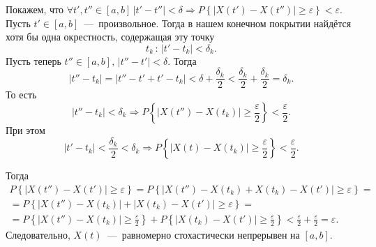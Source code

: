 Покажем, что
$ \forall t', t'' \in \left[ a, b \right] \,
  \left| t' - t'' \right| < \delta \Rightarrow
  P \left\{ \left| X \left( t' \right) - X \left( t'' \right) \right| \geq \varepsilon \right\} <
  \varepsilon $.
Пусть $t' \in \left[ a, b \right] $~---~произвольное.
Тогда в нашем конечном покрытии найдётся хотя бы одна окрестность, содержащая эту точку
\begin{equation*}
  t_k \, : \,
  \left| t' - t_k \right| < \delta_k.
\end{equation*}
Пусть теперь $t'' \in \left[ a, b \right], \, \left| t'' - t' \right| < \delta $.
Тогда
\begin{equation*}
  \left| t'' - t_k \right| =
  \left| t'' - t' + t' - t_k \right| <
  \delta + \frac{ \delta_k}{2} <
  \frac{ \delta_k}{2} + \frac{ \delta_k}{2} =
  \delta_k.
\end{equation*}
То есть
\begin{equation*}
  \left| t'' - t_k \right| < \delta_k \Rightarrow
  P \left\{
    \left| X \left( t'' \right) - X \left( t_k \right) \right| \geq \frac{ \varepsilon }{2}
  \right\} < \frac{ \varepsilon }{2}.
\end{equation*}
При этом
\begin{equation*}
  \left| t' - t_k \right| < \frac{ \delta_k }{2} < \delta_k \Rightarrow
  P \left\{
    \left| X \left( t \right) - X \left( t_k \right) \right| \geq \frac{ \varepsilon }{2} \right\} <
  \frac{ \varepsilon }{2}.
\end{equation*}

Тогда
\begin{gather*}
  P \left\{ \left| X \left( t'' \right) - X \left( t' \right) \right| \geq \varepsilon \right\} =
  P \left\{
    \left|
      X \left( t'' \right) - X \left( t_k \right) + X \left( t_k \right) - X \left( t' \right)
    \right| \geq \varepsilon \right\} = \\
  = P \left\{
    \left| X \left( t'' \right) - X \left( t_k \right) \right| +
    \left| X \left( t_k \right) - X \left( t' \right) \right| \geq
    \varepsilon \right\} = \\
  = P \left\{
    \left| X \left( t'' \right) - X \left( t_k \right) \right| \geq \frac{\varepsilon }{2}
  \right\} +
  P \left\{
    \left| X \left( t_k \right) - X \left( t' \right) \right| \geq \frac{ \varepsilon }{2}
  \right\} <
  \frac{ \varepsilon }{2} + \frac{ \varepsilon }{2} =
  \varepsilon.
\end{gather*}
Следовательно,
$X \left( t \right) $~---~равномерно стохастически непрерывен на $ \left[ a, b \right] $.

